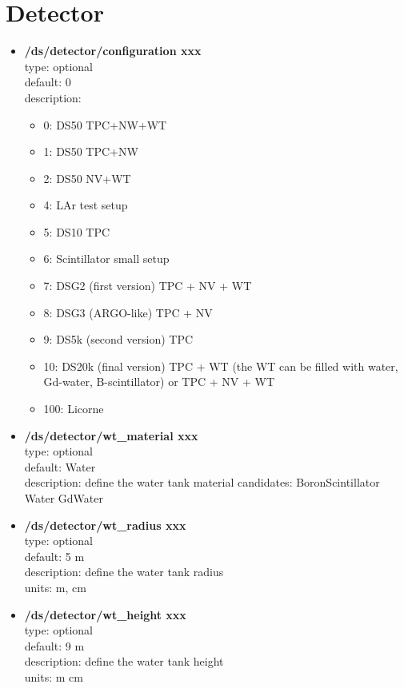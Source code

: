 \documentclass[twocolumn, 10pt]{article}
\begin{document}
\section{Detector}
\begin{itemize}
\item \textbf{/ds/detector/configuration xxx}\\
type: optional \\
default: 0 \\
description:  
\begin{itemize}
\item 0: DS50 TPC+NW+WT
\item 1: DS50 TPC+NW
\item 2: DS50 NV+WT
\item 4: LAr test setup
\item 5: DS10 TPC
\item 6: Scintillator small setup
\item 7: DSG2 (first version) TPC + NV + WT
\item 8: DSG3 (ARGO-like) TPC + NV
\item 9: DS5k (second version) TPC
\item 10: DS20k (final version) TPC + WT (the WT can be filled with water, Gd-water, B-scintillator) or TPC + NV + WT
\item 100: Licorne
\end{itemize}


\item \textbf{/ds/detector/wt\_material xxx}\\
type: optional \\
default: Water \\
description: define the water tank material 
candidates: BoronScintillator Water GdWater\\

\item \textbf{/ds/detector/wt\_radius xxx}\\
type: optional \\
default: 5 m  \\
description: define the water tank radius \\
units: m, cm \\

\item \textbf{/ds/detector/wt\_height xxx}\\
type: optional \\
default: 9 m  \\
description: define the water tank height \\
units: m cm \\





\end{itemize}
\end{document}
